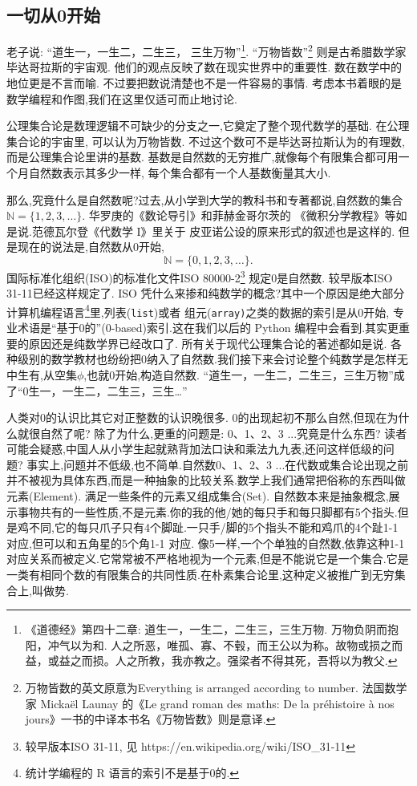 \documentclass[main.tex]{subfiles}
\begin{document}
\subsection{一切从0开始}
老子说: “道生一，一生二，二生三，
三生万物”\footnote{《道德经》第四十二章: 道生一，一生二，二生三，三生万物. 万物负阴而抱阳，冲气以为和. 人之所恶，唯孤、寡、不毂，而王公以为称。故物或损之而益，或益之而损。人之所教，我亦教之。强梁者不得其死，吾将以为教父.}.
“万物皆数”\footnote{万物皆数的英文原意为Everything is arranged according to number. 
	法国数学家 Mickaël Launay 的《Le grand roman des maths: De la préhistoire à nos jours》一书的中译本书名《万物皆数》则是意译.}
则是古希腊数学家毕达哥拉斯的宇宙观. 他们的观点反映了数在现实世界中的重要性. 数在数学中的地位更是不言而喻.
不过要把数说清楚也不是一件容易的事情. 考虑本书着眼的是数学编程和作图,我们在这里仅适可而止地讨论. 

公理集合论是数理逻辑不可缺少的分支之一,它奠定了整个现代数学的基础. 在公理集合论的宇宙里, 可以认为万物皆数. 
不过这个数可不是毕达哥拉斯认为的有理数, 而是公理集合论里讲的基数.
基数是自然数的无穷推广,就像每个有限集合都可用一个月自然数表示其多少一样,
每个集合都有一个人基数衡量其大小.

那么,究竟什么是自然数呢?过去,从小学到大学的教科书和专著都说,自然数的集合$\mathbb{N} = \{1, 2, 3, \dots\}$.
华罗庚的《数论导引》\cite{HuaL}和菲赫金哥尔茨的
《微积分学教程》\cite{FeiH1}等如是说.范德瓦尔登《代数学 I》\cite{derWaerden}里关于
皮亚诺公设的原来形式的叙述也是这样的.
但是现在的说法是,自然数从0开始, 
$$\mathbb{N} = \{0,1, 2, 3, \dots\}.$$
 国际标准化组织(ISO)的标准化文件ISO 80000-2\footnote{较早版本ISO 31-11, 见  https://en.wikipedia.org/wiki/ISO\_31-11}
 规定0是自然数. 较早版本ISO 31-11已经这样规定了. ISO 凭什么来掺和纯数学的概念?其中一个原因是绝大部分计算机编程语言\footnote{统计学编程的 R 语言的索引不是基于0的.}里,列表(\texttt{list})或者
 组元(\texttt{array)}之类的数据的索引是从0开始,
 专业术语是“基于0的”(0-based)索引.这在我们以后的 Python 编程中会看到.其实更重要的原因还是纯数学界已经改口了.
 所有关于现代公理集合论的著述都如是说\cite{HalmosP}\cite{KelleyJ}\cite{JiangJi}. 各种级别的数学教材也纷纷把0纳入了自然数.我们接下来会讨论整个纯数学是怎样无中生有,从空集$\phi$,也就0开始,构造自然数.
“道生一，一生二，二生三，三生万物”成了“0生一，一生二，二生三，三生\dots”

人类对0的认识比其它对正整数的认识晚很多. 0的出现起初不那么自然,但现在为什么就很自然了呢?
除了为什么,更重的问题是: 0、1、2、3 ...究竟是什么东西?
读者可能会疑惑,中国人从小学生起就熟背加法口诀和乘法九九表,还问这样低级的问题?
事实上,问题并不低级,也不简单.自然数0、1、2、3 ...在代数或集合论出现之前并不被视为具体东西,而是一种抽象的比较关系.数学上我们通常把俗称的东西叫做元素(Element).
满足一些条件的元素又组成集合(Set).
自然数本来是抽象概念,展示事物共有的一些性质,不是元素.你的我的他/她的每只手和每只脚都有5个指头.但是鸡不同,它的每只爪子只有4个脚趾.一只手/脚的5个指头不能和鸡爪的4个趾1-1 对应,但可以和五角星的5个角1-1 对应.
像5一样,一个个单独的自然数,依靠这种1-1 对应关系而被定义.它常常被不严格地视为一个元素,但是不能说它是一个集合.它是一类有相同个数的有限集合的共同性质.在朴素集合论里,这种定义被推广到无穷集合上,叫做势.
\end{document}
